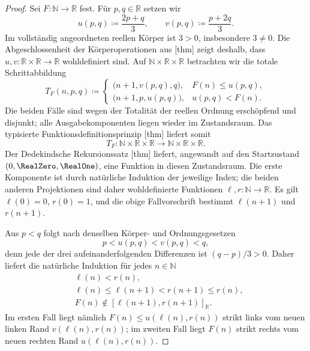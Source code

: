 \documentclass[main.tex]{subfiles}
\begin{document}
\begin{proof}
Sei \(F\colon\mathbb N\to\mathbb R\) fest. Für \(p,q\in\mathbb R\) setzen
wir
\[
  u(p,q)\coloneqq\frac{2p+q}{3},
  \qquad
  v(p,q)\coloneqq\frac{p+2q}{3}.
\]
Im vollständig angeordneten reellen Körper ist \(3>0\), insbesondere
\(3\neq0\). Die Abgeschlossenheit der Körperoperationen aus
[thm] zeigt deshalb, dass
\(u,v\colon\mathbb R\times\mathbb R\to\mathbb R\) wohldefiniert sind.
Auf \(\mathbb N\times\mathbb R\times\mathbb R\) betrachten wir die totale
Schrittabbildung
\[
  T_F(n,p,q)\coloneqq
  \begin{cases}
    \bigl(n+1,v(p,q),q\bigr),&F(n)\leq u(p,q),\\
    \bigl(n+1,p,u(p,q)\bigr),&u(p,q)<F(n).
  \end{cases}
\]
Die beiden Fälle sind wegen der Totalität der reellen Ordnung erschöpfend und
disjunkt; alle Ausgabekomponenten liegen wieder im Zustandsraum. Das typisierte
Funktionsdefinitionsprinzip
[thm] liefert somit
\[
  T_F\colon
  \mathbb N\times\mathbb R\times\mathbb R
  \longrightarrow
  \mathbb N\times\mathbb R\times\mathbb R.
\]
Der Dedekindsche Rekursionssatz
[thm] liefert, angewandt auf den
Startzustand \((0,\RealZero,\RealOne)\), eine Funktion in diesen Zustandsraum.
Die erste Komponente ist durch natürliche Induktion der jeweilige Index;
die beiden anderen Projektionen sind daher wohldefinierte Funktionen
\(\ell,r\colon\mathbb N\to\mathbb R\). Es gilt
\(\ell(0)=0\), \(r(0)=1\), und die obige Fallvorschrift bestimmt
\(\ell(n+1)\) und \(r(n+1)\).

Aus \(p<q\) folgt nach denselben Körper- und Ordnungsgesetzen
\[
  p<u(p,q)<v(p,q)<q,
\]
denn jede der drei aufeinanderfolgenden Differenzen ist
\((q-p)/3>0\). Daher liefert die natürliche Induktion für jedes
\(n\in\mathbb N\)
\[
  \begin{aligned}
    &\ell(n)<r(n),\\[-2pt]
    &\ell(n)\leq\ell(n+1)
      <r(n+1)\leq r(n),\\[-2pt]
    &F(n)\notin
      [\ell(n+1),r(n+1)]_{\mathbb R}.
  \end{aligned}
\]
Im ersten Fall liegt nämlich \(F(n)\leq u(\ell(n),r(n))\) strikt links vom
neuen linken Rand \(v(\ell(n),r(n))\); im zweiten Fall liegt \(F(n)\)
strikt rechts vom neuen rechten Rand \(u(\ell(n),r(n))\).


\end{proof}
\end{document}
